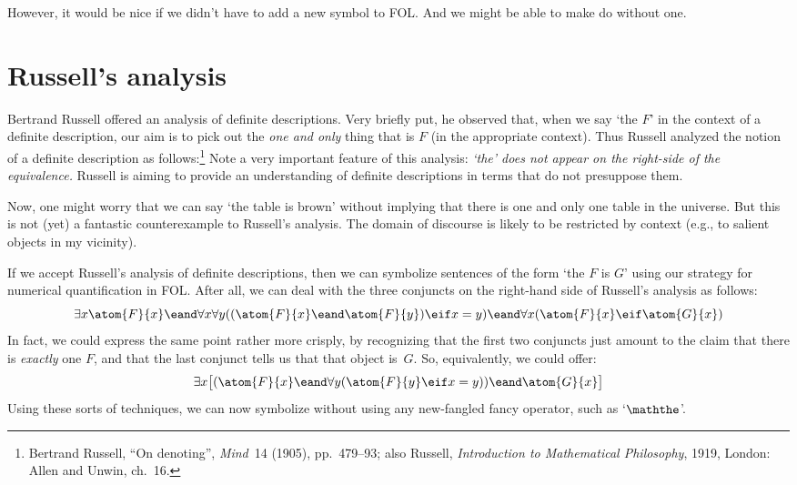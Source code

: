 However, it would be nice if we didn't have to add a new symbol to FOL. And we might be able to make do without one.

\section{Russell's analysis}
Bertrand Russell offered an analysis of definite descriptions. Very
briefly put, he observed that, when we say `the $F$' in the context of
a definite description, our aim is to pick out the \emph{one and only}
thing that is $F$ (in the appropriate context). Thus Russell analyzed
the notion of a definite description as follows:\footnote{Bertrand
Russell, ``On denoting'',  \emph{Mind}~14 (1905), pp.\ 479--93; also
Russell, \textit{Introduction to Mathematical Philosophy}, 1919,
London: Allen and Unwin, ch.~16.}
Note a very important feature of this analysis: \emph{`the' does not appear on the right-side of the equivalence.} Russell is aiming to provide an understanding of definite descriptions in terms that do not presuppose them.

Now, one might worry that we can say `the table is brown' without implying that there is one and only one table in the universe. But this is not (yet) a fantastic counterexample to Russell's analysis. The domain of discourse is likely to be restricted by context (e.g., to salient objects in my vicinity).

If we accept Russell's analysis of definite descriptions, then we can symbolize sentences of the form `the $F$ is $G$' using our strategy for numerical quantification in FOL. After all, we can deal with the three conjuncts on the right-hand side of Russell's analysis as follows:
	$$\exists x \atom{F}{x} \eand \forall x \forall y ((\atom{F}{x} \eand \atom{F}{y}) \eif x = y) \eand \forall x (\atom{F}{x} \eif \atom{G}{x})$$
In fact, we could express the same point rather more crisply, by recognizing that the first two conjuncts just amount to the claim that there is \emph{exactly} one $F$, and that the last conjunct tells us that that object is~$G$. So, equivalently, we could offer:
	$$\exists x \bigl[(\atom{F}{x} \eand \forall y (\atom{F}{y} \eif x = y)) \eand \atom{G}{x}\bigr]$$
Using these sorts of techniques, we can now symbolize  without using any new-fangled fancy operator, such as `$\maththe$'.

